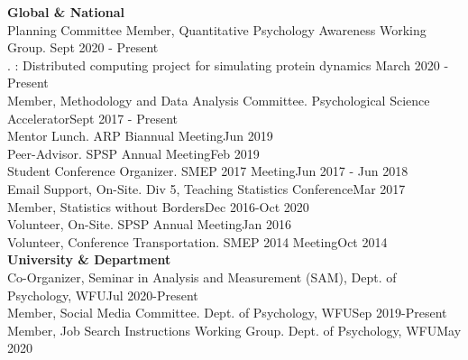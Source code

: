 {\large \textbf{Global \& National}}\smallskip\\
Planning Committee Member, Quantitative Psychology Awareness Working Group. \hfill{Sept 2020 - Present}\smallskip\\
. : Distributed computing project for simulating protein dynamics \hfill{March 2020 - Present}\smallskip\\
%
Member, Methodology and Data Analysis Committee. Psychological Science Accelerator\hfill{Sept 2017 - Present}\smallskip\\
%
Mentor Lunch. ARP Biannual Meeting\hfill{Jun 2019}\smallskip\\
Peer-Advisor. SPSP Annual Meeting\hfill{Feb 2019}\smallskip\\
Student Conference Organizer. SMEP 2017 Meeting\hfill{Jun 2017 - Jun 2018}\smallskip\\
Email Support, On-Site. Div 5, Teaching Statistics Conference\hfill{Mar 2017}\smallskip\\
Member, Statistics without Borders\hfill{Dec 2016-Oct 2020}\smallskip\\
Volunteer, On-Site. SPSP Annual Meeting\hfill{Jan 2016}\smallskip\\
Volunteer, Conference Transportation. SMEP 2014 Meeting\hfill{Oct 2014}\medskip\\
%
%
{\large \textbf{University \& Department}}\smallskip\\
Co-Organizer, Seminar in Analysis and Measurement (SAM), Dept. of Psychology, WFU\hfill {Jul 2020-Present}\smallskip\\
Member, Social Media Committee. Dept. of Psychology, WFU\hfill {Sep 2019-Present}\smallskip\\
Member, Job Search Instructions Working Group. Dept. of Psychology, WFU\hfill {May 2020}\smallskip\\
